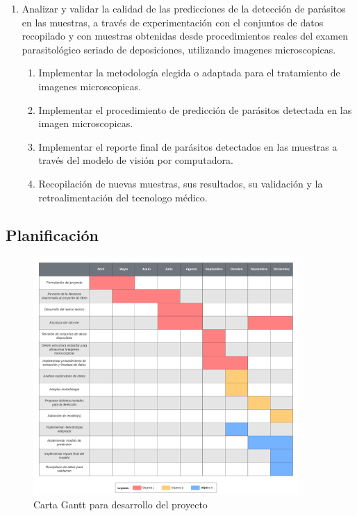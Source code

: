 \documentclass[letter,12pt]{report}
\begin{document}
\begin{enumerate}
  \item Analizar y validar la calidad de las predicciones de la detección de parásitos en las muestras, a través de experimentación con el conjuntos de datos recopilado y con muestras obtenidas desde procedimientos reales del examen parasitológico seriado de deposiciones, utilizando imagenes microscopicas.
      \begin{enumerate}
          \item Implementar la metodología elegida o adaptada para el tratamiento de
              imagenes microscopicas.
          \item Implementar el procedimiento de predicción de parásitos detectada en las
              imagen microscopicas.
          \item Implementar el reporte final de parásitos detectados en las muestras a
              través del modelo de visión por computadora.
          \item Recopilación de nuevas muestras, sus resultados, su validación y la
              retroalimentación del tecnologo médico.
      \end{enumerate}
\end{enumerate}


\subsection{Planificación}
\begin{figure}[H]
    \centering
    \includegraphics[width=0.9\textwidth]{gantt}
    \caption{Carta Gantt para desarrollo del proyecto}
    \label{fig:gantt}
\end{figure}
\end{document}
